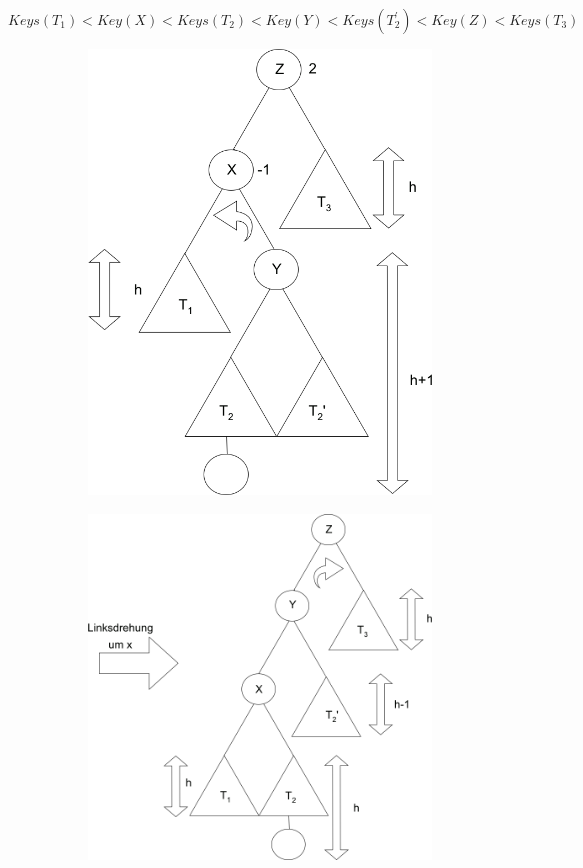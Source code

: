 $Keys(T_1) < Key(X) < Keys(T_2) < Key(Y) < Keys(T_2^{'}) < Key(Z) < Keys(T_3)$

\begin{figure}
	\begin{subfigure}[H]{0.29\textwidth}
		\includegraphics[width=\linewidth]{11/Grafik/img5_doppelRotation_2.png}
	\end{subfigure}
	\begin{subfigure}[H]{0.29\textwidth}
			\includegraphics[width=\linewidth]{11/Grafik/img6_doppelRotation_3.png}

\end{subfigure}
\end{figure}
